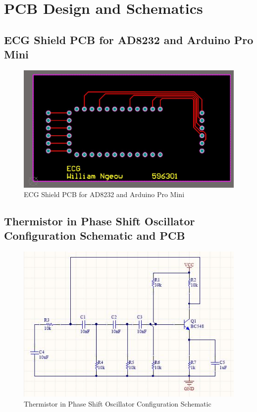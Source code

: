 \chapter{PCB Design and Schematics}


\section{ECG Shield PCB for AD8232 and Arduino Pro Mini}
\label{ecgshieldpcb}

\begin{figure}[H]
	\centering
	\includegraphics[width=0.8\linewidth]{ecgshield.jpg}
	\caption{ECG Shield PCB for AD8232 and Arduino Pro Mini}
\end{figure}

\section{Thermistor in Phase Shift Oscillator Configuration Schematic and PCB}

\begin{figure}[H]
	\centering
	\includegraphics[width=0.7\linewidth]{psoschematic.jpg}
	\caption{Thermistor in Phase Shift Oscillator Configuration Schematic}
\end{figure}

